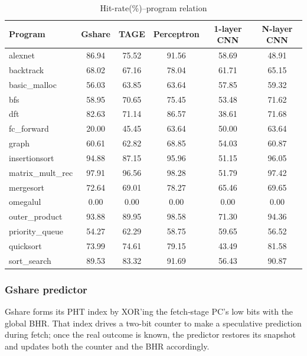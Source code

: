 \begin{table}[ht]
  \scriptsize
  \setlength{\tabcolsep}{2pt}
  \caption{Hit-rate(\%)–program relation}
  \label{tab:branch-hit}
  \begin{tabular*}{\columnwidth}{@{\extracolsep{\fill}}lccccc}
    \toprule
    Program & Gshare & TAGE & Perceptron & 1-layer CNN & N-layer CNN \\
    \midrule
    alexnet           & 86.94 & 75.52 & 91.56 & 58.69 & 48.91 \\
    backtrack         & 68.02 & 67.16 & 78.04 & 61.71 & 65.15 \\
    basic\_malloc     & 56.03 & 63.85 & 63.64 & 57.85 & 59.32 \\
    bfs               & 58.95 & 70.65 & 75.45 & 53.48 & 71.62 \\
    dft               & 82.63 & 71.14 & 86.57 & 38.61 & 71.68 \\
    fc\_forward       & 20.00 & 45.45 & 63.64 & 50.00 & 63.64 \\
    graph             & 60.61 & 62.82 & 68.85 & 54.03 & 60.87 \\
    insertionsort     & 94.88 & 87.15 & 95.96 & 51.15 & 96.05 \\
    matrix\_mult\_rec & 97.91 & 96.56 & 98.28 & 51.79 & 97.42 \\
    mergesort         & 72.64 & 69.01 & 78.27 & 65.46 & 69.65 \\
    omegalul          &  0.00 &  0.00 &  0.00 &  0.00 &  0.00 \\
    outer\_product    & 93.88 & 89.95 & 98.58 & 71.30 & 94.36 \\
    priority\_queue   & 54.27 & 62.29 & 58.75 & 59.65 & 56.52 \\
    quicksort         & 73.99 & 74.61 & 79.15 & 43.49 & 81.58 \\
    sort\_search      & 89.53 & 83.32 & 91.69 & 56.43 & 90.87 \\
    \bottomrule
  \end{tabular*}
\end{table}

\subsubsection{Gshare predictor}

Gshare forms its PHT index by XOR’ing the fetch‐stage PC’s low bits with the global BHR.  That index drives a two-bit counter to make a speculative prediction during fetch; once the real outcome is known, the predictor restores its snapshot and updates both the counter and the BHR accordingly.

